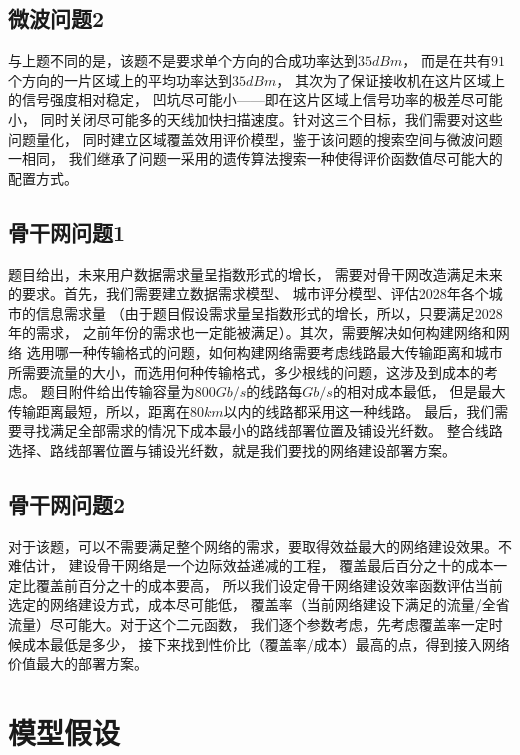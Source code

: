\documentclass[UTF8,12pt]{ctexart}
\begin{document}
    \subsection{微波问题2}
        与上题不同的是，该题不是要求单个方向的合成功率达到$35dBm$，
        而是在共有$91$个方向的一片区域上的平均功率达到$35dBm$，
        其次为了保证接收机在这片区域上的信号强度相对稳定，
        凹坑尽可能小——即在这片区域上信号功率的极差尽可能小，
        同时关闭尽可能多的天线加快扫描速度。针对这三个目标，我们需要对这些问题量化，
        同时建立区域覆盖效用评价模型，鉴于该问题的搜索空间与微波问题一相同，
        我们继承了问题一采用的遗传算法搜索一种使得评价函数值尽可能大的配置方式。

    \subsection{骨干网问题1}
        题目给出，未来用户数据需求量呈指数形式的增长，
        需要对骨干网改造满足未来的要求。首先，我们需要建立数据需求模型、
        城市评分模型、评估2028年各个城市的信息需求量
        （由于题目假设需求量呈指数形式的增长，所以，只要满足2028年的需求，
        之前年份的需求也一定能被满足）。其次，需要解决如何构建网络和网络
        选用哪一种传输格式的问题，如何构建网络需要考虑线路最大传输距离和城市
        所需要流量的大小，而选用何种传输格式，多少根线的问题，这涉及到成本的考虑。
        题目附件给出传输容量为$800Gb/s$的线路每$Gb/s$的相对成本最低，
        但是最大传输距离最短，所以，距离在$80km$以内的线路都采用这一种线路。
        最后，我们需要寻找满足全部需求的情况下成本最小的路线部署位置及铺设光纤数。
        整合线路选择、路线部署位置与铺设光纤数，就是我们要找的网络建设部署方案。

    \subsection{骨干网问题2}
        对于该题，可以不需要满足整个网络的需求，要取得效益最大的网络建设效果。不难估计，
        建设骨干网络是一个边际效益递减的工程，
        覆盖最后百分之十的成本一定比覆盖前百分之十的成本要高，
        所以我们设定骨干网络建设效率函数评估当前选定的网络建设方式，成本尽可能低，
        覆盖率（当前网络建设下满足的流量/全省流量）尽可能大。对于这个二元函数，
        我们逐个参数考虑，先考虑覆盖率一定时候成本最低是多少，
        接下来找到性价比（覆盖率/成本）最高的点，得到接入网络价值最大的部署方案。
        
        


\newpage
\section{模型假设}\label{mxjs}
\end{document}

